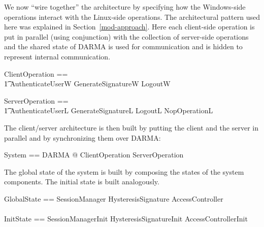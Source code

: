 \documentclass[a4paper,pdftex]{article}
\begin{document}
We now ``wire together'' the architecture by specifying how the
Windows-side operations interact with the Linux-side operations. 
The architectural pattern used here
was explained in Section~\ref{mod-approach}.
Here  each client-side operation is put in
parallel (using conjunction) with the collection of server-side
operations and the shared state of DARMA is used for communication and
is hidden to represent internal communication.

\begin{zed}
ClientOperation == \\
\t1  AuthenticateUserW \lor GenerateSignatureW \lor  LogoutW
\end{zed}

\begin{zed}
ServerOperation == \\
\t1  AuthenticateUserL \lor GenerateSignatureL \lor  LogoutL \lor NopOperationL
\end{zed}

The client/server architecture is then built by putting the client and
the server in parallel and by synchronizing them over DARMA:

\begin{zed}
System        == \exists DARMA @ ClientOperation \land ServerOperation\\
\end{zed}

The global state of the system is built by composing the states of
the system components.  The initial state is built analogously.

\begin{zed}
GlobalState     == SessionManager \land HysteresisSignature \land AccessController \\
\\
InitState       == SessionManagerInit \land  HysteresisSignatureInit \land AccessControllerInit \\
\end{zed}
\end{document}
